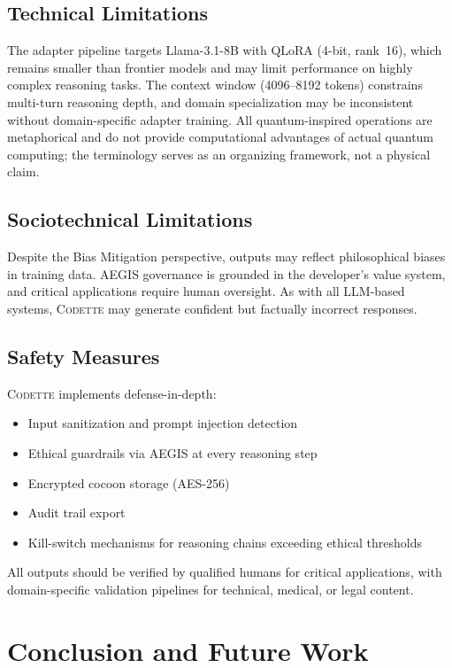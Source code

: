 \documentclass[11pt,a4paper]{article}
\newcommand{\codette}{\textsc{Codette}}
\begin{document}
\subsection{Technical Limitations}
The adapter pipeline targets Llama-3.1-8B with QLoRA (4-bit, rank~16), which remains smaller than frontier models and may limit performance on highly complex reasoning tasks. The context window (4096--8192 tokens) constrains multi-turn reasoning depth, and domain specialization may be inconsistent without domain-specific adapter training. All quantum-inspired operations are metaphorical and do not provide computational advantages of actual quantum computing; the terminology serves as an organizing framework, not a physical claim.

\subsection{Sociotechnical Limitations}
Despite the Bias Mitigation perspective, outputs may reflect philosophical biases in training data. AEGIS governance is grounded in the developer's value system, and critical applications require human oversight. As with all LLM-based systems, \codette{} may generate confident but factually incorrect responses.

\subsection{Safety Measures}
\codette{} implements defense-in-depth:
\begin{itemize}[leftmargin=*]
  \item Input sanitization and prompt injection detection
  \item Ethical guardrails via AEGIS at every reasoning step
  \item Encrypted cocoon storage (AES-256)
  \item Audit trail export
  \item Kill-switch mechanisms for reasoning chains exceeding ethical thresholds
\end{itemize}
All outputs should be verified by qualified humans for critical applications, with domain-specific validation pipelines for technical, medical, or legal content.

\section{Conclusion and Future Work}
\label{sec:conclusion}
\end{document}
